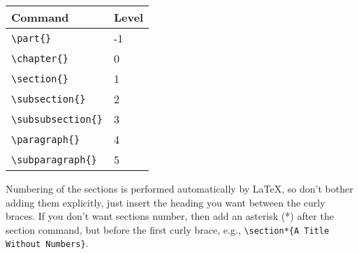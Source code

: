 \documentclass{article}
\begin{document}
\begin{center}
  \begin{tabular}{|l|l|} 
    
    \hline  %
    Command & Level \\ \hline  %
    \verb|\part{}| & -1 \\
    \verb|\chapter{}| & 0 \\
    \verb|\section{}| & 1  \\
    \verb|\subsection{}| & 2 \\
    \verb|\subsubsection{}| & 3 \\
    \verb|\paragraph{}| & 4 \\
    \verb|\subparagraph{}| & 5 \\
    \hline
  \end{tabular}
\end{center}

Numbering of the sections is performed automatically by \LaTeX{}, so don't
bother adding them explicitly, just insert the heading you want between
the curly braces.  If you don't want sections number, then add an asterisk (*) after the
section command, but before the first curly brace, e.g., \verb|\section*{A Title Without Numbers}|.
\end{document}
